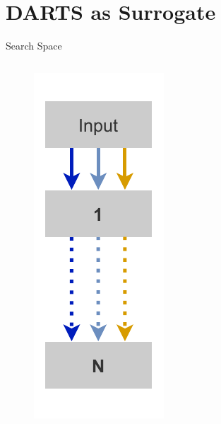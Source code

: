 \documentclass[]{beamer}
\begin{document}
\section{DARTS as Surrogate}
\begin{frame}{Search Space}
\vspace{5pt}
\vfill
\begin{columns}
\begin{column}{.96\textwidth}
\begin{figure}
    \begin{center}
    \includegraphics[scale=.85]{graphics/quick/search_space.drawio.pdf}
  \end{center} 
\end{figure}
\end{column}
\begin{column}{.04\textwidth}
\end{column}
\end{columns}
\end{frame}
\end{document}

